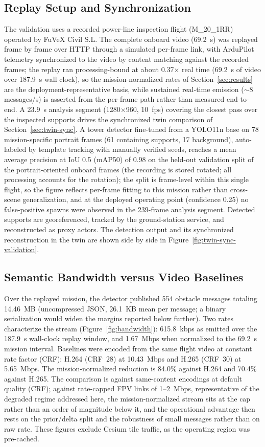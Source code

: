 \documentclass[fleqn]{VRIH2025}
\begin{document}
\subsection{Replay Setup and Synchronization}
\label{sec:replay-setup}
The validation uses a recorded power-line inspection flight (M\_20\_1RR) operated by FuVeX Civil S.L. The complete onboard video (69.2~s) was replayed frame by frame over HTTP through a simulated per-frame link, with ArduPilot telemetry synchronized to the video by content matching against the recorded frames; the replay ran processing-bound at about 0.37$\times$ real time (69.2~s of video over 187.9~s wall clock), so the mission-normalized rates of Section~\ref{sec:results} are the deployment-representative basis, while sustained real-time emission ($\sim$8 messages/s) is asserted from the per-frame path rather than measured end-to-end. A 23.9~s analysis segment (1280$\times$960, 10~fps) covering the closest pass over the inspected supports drives the synchronized twin comparison of Section~\ref{sec:twin-sync}. A tower detector fine-tuned from a YOLO11n base on 78 mission-specific portrait frames (61 containing supports, 17 background), auto-labeled by template tracking with manually verified seeds, reaches a mean average precision at IoU 0.5 (mAP50) of 0.98 on the held-out validation split of the portrait-oriented onboard frames (the recording is stored rotated; all processing accounts for the rotation); the split is frame-level within this single flight, so the figure reflects per-frame fitting to this mission rather than cross-scene generalization, and at the deployed operating point (confidence 0.25) no false-positive spawns were observed in the 239-frame analysis segment. Detected supports are georeferenced, tracked by the ground-station service, and reconstructed as proxy actors. The detection output and its synchronized reconstruction in the twin are shown side by side in Figure~\ref{fig:twin-sync-validation}.

\subsection{Semantic Bandwidth versus Video Baselines}
Over the replayed mission, the detector published 554 obstacle messages totaling 14.46~MB (uncompressed JSON, 26.1~KB mean per message; a binary serialization would widen the margins reported below further). Two rates characterize the stream (Figure~\ref{fig:bandwidth}): 615.8~kbps as emitted over the 187.9~s wall-clock replay window, and 1.67~Mbps when normalized to the 69.2~s mission interval. Baselines were encoded from the same flight video at constant rate factor (CRF): H.264 (CRF~28) at 10.43~Mbps and H.265 (CRF~30) at 5.65~Mbps. The mission-normalized reduction is 84.0\% against H.264 and 70.4\% against H.265. The comparison is against same-content encodings at default quality (CRF); against rate-capped FPV links of 1--2~Mbps, representative of the degraded regime addressed here, the mission-normalized stream sits at the cap rather than an order of magnitude below it, and the operational advantage then rests on the prior/delta split and the robustness of small messages rather than on raw rate. These figures exclude Cesium tile traffic, as the operating region was pre-cached.
\end{document}
